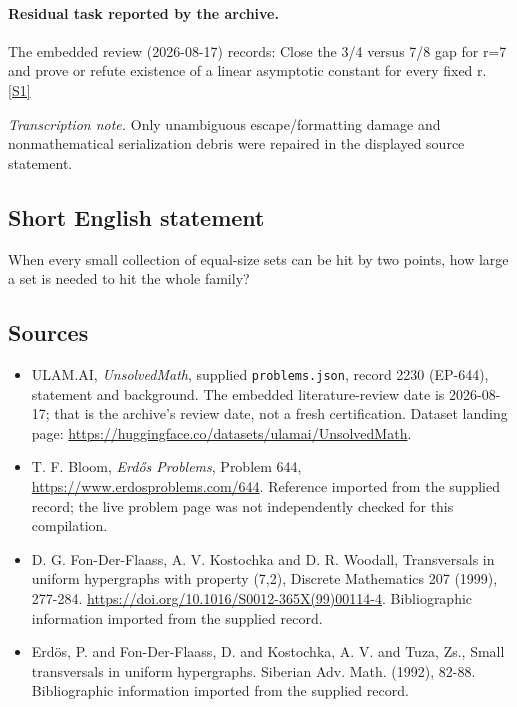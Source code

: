 \documentclass[11pt,a4paper]{article}
\newcommand{\sref}[2]{\hyperlink{source:#1:#2}{[S#2]}}
\begin{document}
\paragraph{Residual task reported by the archive.}

The embedded review (2026-08-17) records: Close the 3/4 versus 7/8 gap for r=7 and prove or refute existence of a linear asymptotic constant for every fixed r. \sref{2230}{1}

{\small\emph{Transcription note.} Only unambiguous escape/formatting damage and nonmathematical serialization debris were repaired in the displayed source statement.}

\subsection{Short English statement}

When every small collection of equal-size sets can be hit by two points, how large a set is needed to hit the whole family?

\subsection{Sources}

{\small

\begin{itemize}

\item[\hypertarget{source:2230:1}{S1}] ULAM.AI, \emph{UnsolvedMath}, supplied \texttt{problems.json}, record 2230 (EP-644), statement and background. The embedded literature-review date is 2026-08-17; that is the archive’s review date, not a fresh certification. Dataset landing page: \url{https://huggingface.co/datasets/ulamai/UnsolvedMath}.

\item[\hypertarget{source:2230:2}{S2}] T. F. Bloom, \emph{Erdős Problems}, Problem 644, \url{https://www.erdosproblems.com/644}. Reference imported from the supplied record; the live problem page was not independently checked for this compilation.

\item[\hypertarget{source:2230:3}{S3}] D. G. Fon-Der-Flaass, A. V. Kostochka and D. R. Woodall, Transversals in uniform hypergraphs with property (7,2), Discrete Mathematics 207 (1999), 277-284. \url{https://doi.org/10.1016/S0012-365X(99)00114-4}. Bibliographic information imported from the supplied record.

\item[\hypertarget{source:2230:4}{S4}] Erd\"{o}s, P. and Fon-Der-Flaass, D. and Kostochka, A. V. and Tuza, Zs., Small transversals in uniform hypergraphs. Siberian Adv. Math. (1992), 82-88. Bibliographic information imported from the supplied record.

\end{itemize}

}

\label{end:2230}
\end{document}
